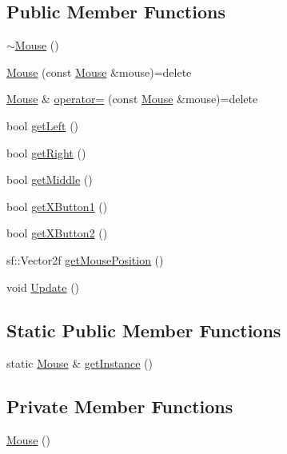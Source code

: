 \subsection*{Public Member Functions}
\begin{DoxyCompactItemize}
\item 
\hyperlink{class_mouse_afdf7d8abef29c10be77ead773f964f4f}{$\sim$\-Mouse} ()
\item 
\hyperlink{class_mouse_a6c87ac5e0784ef185d003486c0cd97a7}{Mouse} (const \hyperlink{class_mouse}{Mouse} \&mouse)=delete
\item 
\hyperlink{class_mouse}{Mouse} \& \hyperlink{class_mouse_a0ba383d1a0ed97fcc7133baeb13dffb9}{operator=} (const \hyperlink{class_mouse}{Mouse} \&mouse)=delete
\item 
bool \hyperlink{class_mouse_aba7bc3e6f4ea41b41d983300cafe94e3}{get\-Left} ()
\item 
bool \hyperlink{class_mouse_a57a56ce6e0c3dee5399dd8bd317f0300}{get\-Right} ()
\item 
bool \hyperlink{class_mouse_a971194f66c07663aa9d9a1f3256a459e}{get\-Middle} ()
\item 
bool \hyperlink{class_mouse_a34e7edee2f57d2b4284e12946b945392}{get\-X\-Button1} ()
\item 
bool \hyperlink{class_mouse_a4f61c34b9a79970983c2151698481b35}{get\-X\-Button2} ()
\item 
sf\-::\-Vector2f \hyperlink{class_mouse_a96a1dc1c7d7edf64110f8bc4795966e2}{get\-Mouse\-Position} ()
\item 
void \hyperlink{class_mouse_add9756fabb1ae55d56e10b930e5592b6}{Update} ()
\end{DoxyCompactItemize}
\subsection*{Static Public Member Functions}
\begin{DoxyCompactItemize}
\item 
static \hyperlink{class_mouse}{Mouse} \& \hyperlink{class_mouse_a96ed80e3232b68b34368c8f1f79f5cff}{get\-Instance} ()
\end{DoxyCompactItemize}
\subsection*{Private Member Functions}
\begin{DoxyCompactItemize}
\item 
\hyperlink{class_mouse_a99024d3700d649ae19c1537b42a3e86d}{Mouse} ()
\end{DoxyCompactItemize}
